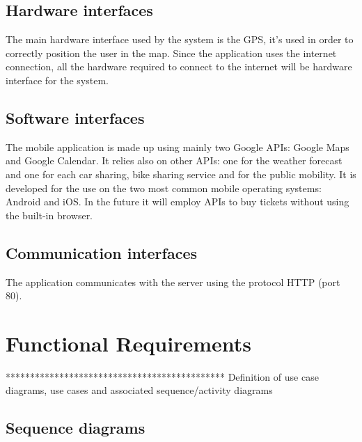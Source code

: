 \subsection{Hardware interfaces}
The main hardware interface used by the system is the GPS, it's used in order to correctly position the user in the map. Since the application uses the internet connection, all the hardware required to connect to the internet will be hardware interface for the system.
%
\subsection{Software interfaces}
The mobile application is made up using mainly two Google APIs: Google Maps and Google Calendar. It relies also on other APIs: one for the weather forecast and one for each car sharing, bike sharing service and for the public mobility.
It is developed for the use on the two most common mobile operating systems: Android and iOS.
In the future it will employ APIs to buy tickets without using the built-in browser.
%
\subsection{Communication interfaces}
The application communicates with the server using the protocol HTTP (port 80).
\section{Functional Requirements}
********************************************* Definition of use case diagrams, use cases and associated sequence/activity diagrams
\subsection*{Sequence diagrams}

